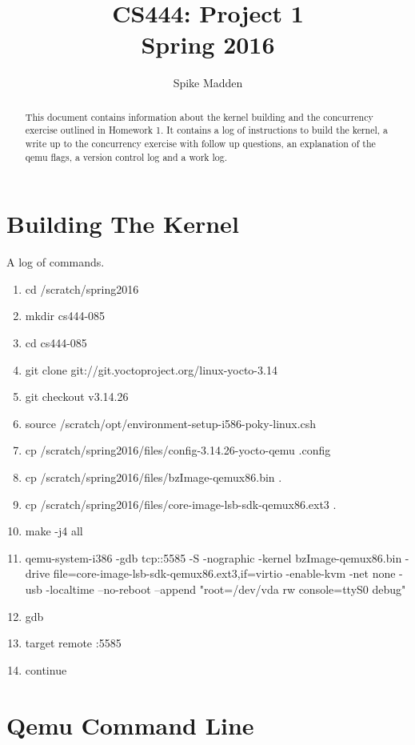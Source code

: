 \documentclass[letterpaper,
10pt, titlepage, draftclsnofoot, onecolumn]{IEEEtran}
\title{CS444: Project 1\\
        \large Spring 2016}
\author{Spike Madden}
\begin{document}
\begin{titlingpage}
	\maketitle
	\begin{abstract}
		This document contains information about the kernel building and the concurrency exercise outlined in Homework 1.
    It contains a log of instructions to build the kernel, a write up to the concurrency exercise with follow up questions,
    an explanation of the qemu flags, a version control log and a work log.

	\end{abstract}
\end{titlingpage}

\section*{Building The Kernel}

A log of commands.

\begin{enumerate}
\item cd /scratch/spring2016
\item mkdir cs444-085
\item cd cs444-085
\item git clone git://git.yoctoproject.org/linux-yocto-3.14
\item git checkout v3.14.26
\item source /scratch/opt/environment-setup-i586-poky-linux.csh
\item cp /scratch/spring2016/files/config-3.14.26-yocto-qemu .config
\item cp /scratch/spring2016/files/bzImage-qemux86.bin .
\item cp /scratch/spring2016/files/core-image-lsb-sdk-qemux86.ext3 .
\item make -j4 all
\item qemu-system-i386 -gdb tcp::5585 -S -nographic -kernel bzImage-qemux86.bin -drive file=core-image-lsb-sdk-qemux86.ext3,if=virtio -enable-kvm -net none -usb -localtime --no-reboot --append "root=/dev/vda rw console=ttyS0 debug"
\item gdb
\item target remote :5585
\item continue
\end{enumerate}

\section*{Qemu Command Line}
\end{document}
